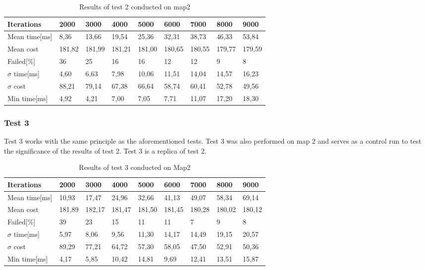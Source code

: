 \begin{table}[!ht]
	\centering
	\renewcommand{\arraystretch}{1.2}
	\begin{tabular}{|l||l|l|l|l|l|l|l|l|}
		\hline
		Iterations & 2000 & 3000 & 4000 & 5000 & 6000 & 7000 & 8000 & 9000 \\ \hline\hline
		Mean time[ms] & 8,36  & 13,66  & 19,54  & 25,36  & 32,31  & 38,73  & 46,33  & 53,84  \\ \hline
		Mean cost & 181,82  & 181,99  & 181,21  & 181,00  & 180,65  & 180,55  & 179,77  & 179,59  \\ \hline
		Failed[\%] & 36  & 25  & 16  & 16  & 12  & 12  & 9  & 8  \\ \hline
		$\sigma$ time[ms] & 4,60  & 6,63  & 7,98  & 10,06  & 11,51  & 14,04  & 14,57  & 16,23  \\ \hline
		$\sigma$ cost & 88,21  & 79,14  & 67,38  & 66,64  & 58,74  & 60,41  & 52,78  & 49,56  \\ \hline
		Min time[ms] & 4,92  & 4,21  & 7,00  & 7,05  & 7,71  & 11,07  & 17,20  & 18,30  \\ \hline
	\end{tabular}
	\label{tab:pp_precision2}
	\caption{Results of test 2 conducted on map2}
\end{table}

\subsubsection{Test 3}
\label{sec:test3}
Test 3 works with the same principle as the aforementioned tests. Test 3 was also performed on map 2 and serves as a control run to test the significance of the results of test 2. Test 3 is a replica of test 2.

\begin{table}[!ht]
	\centering
	\renewcommand{\arraystretch}{1.2}
	\begin{tabular}{|l||l|l|l|l|l|l|l|l|}
		\hline
		Iterations & 2000 & 3000 & 4000 & 5000 & 6000 & 7000 & 8000 & 9000 \\ \hline\hline
		Mean time[ms] & 10,93  & 17,47  & 24,96  & 32,66  & 41,13  & 49,07  & 58,34  & 69,14  \\ \hline
		Mean cost & 181,89  & 182,17  & 181,47  & 181,50  & 181,45  & 180,28  & 180,02  & 180,12  \\ \hline
		Failed[\%] & 39  & 23  & 15  & 11  & 11  & 7  & 9  & 8  \\ \hline
		$\sigma$ time[ms] & 5,97  & 8,06  & 9,56  & 11,30  & 14,17  & 14,49  & 19,15  & 20,57  \\ \hline
		$\sigma$ cost & 89,29  & 77,21  & 64,72  & 57,30  & 58,05  & 47,50  & 52,91  & 50,36  \\ \hline
		Min time[ms] & 4,17  & 5,85  & 10,42  & 14,81  & 9,69  & 12,41  & 13,51  & 15,87  \\ \hline
	\end{tabular}
	\label{tab:pp_precision3}
	\caption{Results of test 3 conducted on Map2}
\end{table}

